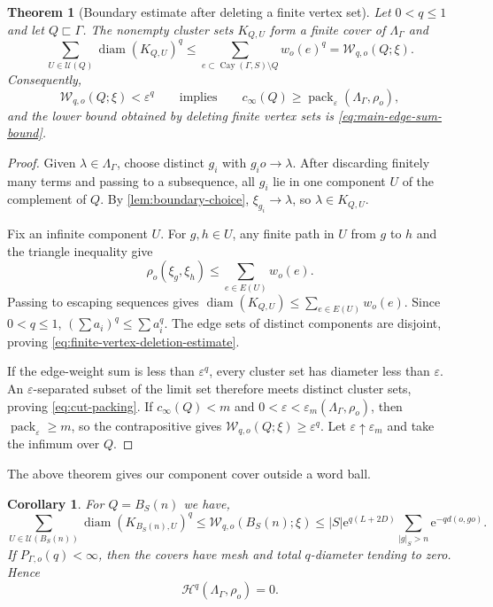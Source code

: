 \documentclass[11pt]{article}
\newtheorem{theorem}{Theorem}[section]
\newtheorem{corollary}[corollary]{Corollary}
\theoremstyle{definition}
\newcommand{\diam}{\operatorname{diam}}
\newcommand{\pack}{\operatorname{pack}}
\newcommand{\EdgeSum}{\mathcal W}
\newcommand{\Cay}{\operatorname{Cay}}
\newcommand{\e}{\mathrm e}
\begin{document}
\begin{theorem}[Boundary estimate after deleting a finite vertex set]
\label{thm:finite-vertex-deletion-boundary}
Let $0<q\le1$ and let $Q\sqsubset\Gamma$.  The nonempty cluster sets $K_{Q,U}$ form a finite
cover of $\Lambda_\Gamma$ and
\begin{equation}\label{eq:finite-vertex-deletion-estimate}
 \sum_{U\in\mathscr U(Q)}\diam(K_{Q,U})^q
 \le \sum_{e\subset\Cay(\Gamma,S)\setminus Q}w_o(e)^q
 =\EdgeSum_{q,o}(Q;\xi).
\end{equation}
Consequently,
\begin{equation}\label{eq:cut-packing}
 \EdgeSum_{q,o}(Q;\xi)<\varepsilon^q
 \qquad\mbox{implies}\qquad
 c_\infty(Q)\ge\pack_\varepsilon(\Lambda_\Gamma,\rho_o),
\end{equation}
and the lower bound obtained by deleting finite vertex sets is \eqref{eq:main-edge-sum-bound}.
\end{theorem}

\begin{proof}
Given $\lambda\in\Lambda_\Gamma$, choose distinct $g_i$ with $g_i o\to\lambda$.  After
discarding finitely many terms and passing to a subsequence, all $g_i$ lie in one component
$U$ of the complement of $Q$.  By \cref{lem:boundary-choice}, $\xi_{g_i}\to\lambda$, so
$\lambda\in K_{Q,U}$.

Fix an infinite component $U$.  For $g,h\in U$, any finite path in $U$ from $g$ to $h$ and
the triangle inequality give
\[
 \rho_o(\xi_g,\xi_h)\le\sum_{e\in E(U)}w_o(e).
\]
Passing to escaping sequences gives
$\diam(K_{Q,U})\le\sum_{e\in E(U)}w_o(e)$.  Since $0<q\le1$,
$(\sum a_i)^q\le\sum a_i^q$.  The edge sets of distinct components are disjoint, proving
\eqref{eq:finite-vertex-deletion-estimate}.

If the edge-weight sum is less than $\varepsilon^q$, every cluster set has diameter less than
$\varepsilon$.  An $\varepsilon$-separated subset of the limit set therefore meets distinct
cluster sets, proving \eqref{eq:cut-packing}.  If $c_\infty(Q)<m$ and
$0<\varepsilon<\varepsilon_m(\Lambda_\Gamma,\rho_o)$, then
$\pack_\varepsilon\ge m$, so the contrapositive gives
$\EdgeSum_{q,o}(Q;\xi)\ge\varepsilon^q$.  Let $\varepsilon\uparrow\varepsilon_m$ and take the
infimum over $Q$.
\end{proof}
The above theorem gives our component cover outside a word ball.
\begin{corollary}
\label{thm:word-ball-cover}
For $Q=B_S(n)$ we have,
\begin{equation}\label{eq:word-ball-cover-estimate}
 \sum_{U\in\mathscr U(B_S(n))}\diam(K_{B_S(n),U})^q
 \le\EdgeSum_{q,o}(B_S(n);\xi)
 \le |S|\e^{q(L+2D)}
 \sum_{|g|_S>n}\e^{-q d(o,go)}.
\end{equation}
If $P_{\Gamma,o}(q)<\infty$, then the covers have mesh and total $q$-diameter tending to zero.
Hence
\begin{equation}\label{eq:word-ball-Hq-zero}
 \mathcal H^q(\Lambda_\Gamma,\rho_o)=0.
\end{equation}
\end{corollary}
\end{document}

